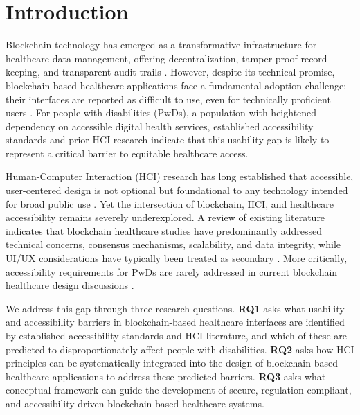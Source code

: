 \documentclass[journal,onecolumn]{IEEEtran}
\begin{document}
\section{Introduction}

Blockchain technology has emerged as a transformative infrastructure for healthcare data management, offering decentralization, tamper-proof record keeping, and transparent audit trails \cite{taherdoost2023role}. However, despite its technical promise, blockchain-based healthcare applications face a fundamental adoption challenge: their interfaces are reported as difficult to use, even for technically proficient users \cite{tharani2022ui,jang2020user}. For people with disabilities (PwDs), a population with heightened dependency on accessible digital health services, established accessibility standards and prior HCI research indicate that this usability gap is likely to represent a critical barrier to equitable healthcare access.

Human-Computer Interaction (HCI) research has long established that accessible, user-centered design is not optional but foundational to any technology intended for broad public use \cite{alfayez2024user}. Yet the intersection of blockchain, HCI, and healthcare accessibility remains severely underexplored. A review of existing literature indicates that blockchain healthcare studies have predominantly addressed technical concerns, consensus mechanisms, scalability, and data integrity, while UI/UX considerations have typically been treated as secondary \cite{tharani2022ui}. More critically, accessibility requirements for PwDs are rarely addressed in current blockchain healthcare design discussions \cite{khalid2023blockchain}.

We address this gap through three research questions. \textbf{RQ1} asks what usability and accessibility barriers in blockchain-based healthcare interfaces are identified by established accessibility standards and HCI literature, and which of these are predicted to disproportionately affect people with disabilities. \textbf{RQ2} asks how HCI principles can be systematically integrated into the design of blockchain-based healthcare applications to address these predicted barriers. \textbf{RQ3} asks what conceptual framework can guide the development of secure, regulation-compliant, and accessibility-driven blockchain-based healthcare systems.
\end{document}
